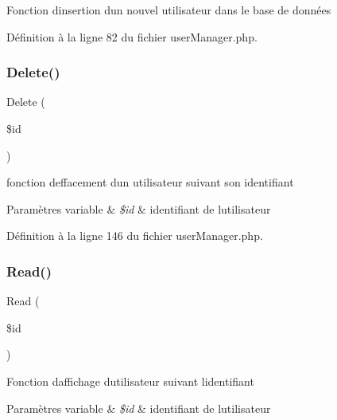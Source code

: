 Fonction d\textquotesingle{}insertion d\textquotesingle{}un nouvel utilisateur dans le base de données 

Définition à la ligne 82 du fichier user\+Manager.\+php.

\mbox{\label{class_src_1_1_managers_1_1user_manager_a59113b5ecd1d155db6a4f30af34a1e80}} 
\subsubsection{\texorpdfstring{Delete()}{Delete()}}
{\footnotesize\ttfamily Delete (\begin{DoxyParamCaption}\item[{}]{\$id }\end{DoxyParamCaption})}

fonction d\textquotesingle{}effacement d\textquotesingle{}un utilisateur suivant son identifiant 
\begin{DoxyParams}[1]{Paramètres}
variable & {\em \$id} & identifiant de l\textquotesingle{}utilisateur \\
\hline
\end{DoxyParams}


Définition à la ligne 146 du fichier user\+Manager.\+php.

\mbox{\label{class_src_1_1_managers_1_1user_manager_ad2bbc9b3130abdfe3a9fc9e9fe36716f}} 
\subsubsection{\texorpdfstring{Read()}{Read()}}
{\footnotesize\ttfamily Read (\begin{DoxyParamCaption}\item[{}]{\$id }\end{DoxyParamCaption})}

Fonction d\textquotesingle{}affichage d\textquotesingle{}utilisateur suivant l\textquotesingle{}identifiant 
\begin{DoxyParams}[1]{Paramètres}
variable & {\em \$id} & identifiant de l\textquotesingle{}utilisateur \\
\hline
\end{DoxyParams}


